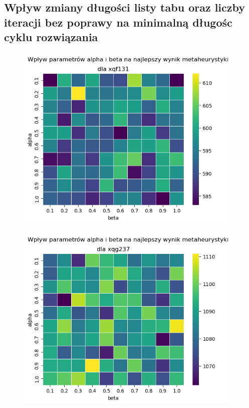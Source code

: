 \documentclass{article}
\begin{document}
\newpage

\subsection{Wpływ zmiany długości listy tabu oraz liczby iteracji bez poprawy na minimalną długośc cyklu rozwiązania}
    \begin{figure}[h!]
        \centering
        \includegraphics[height=9cm]{../../plots/ts-tuning-alpha-beta-min-xqf131.png}
    \end{figure}
    
    \begin{figure}[h!]
        \centering
        \includegraphics[height=9cm]{../../plots/ts-tuning-alpha-beta-min-xqg237.png}
    \end{figure}

\newpage
\end{document}
